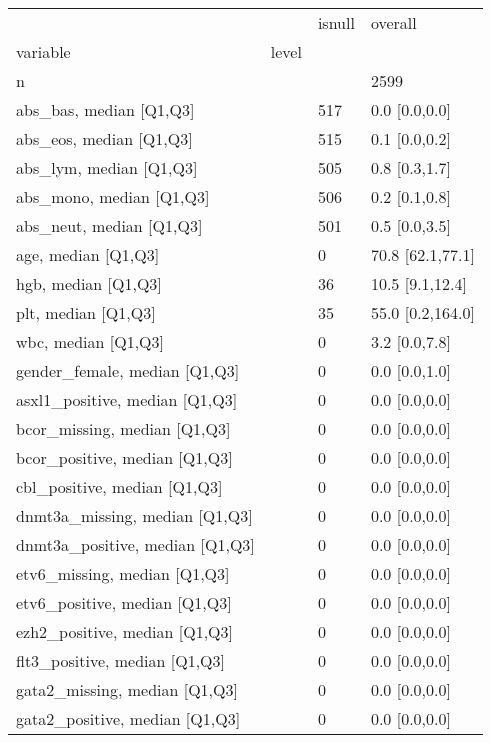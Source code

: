 \begin{tabular}{llll}
\toprule
                 &    & isnull &           overall \\
variable & level &        &                   \\
\midrule
n &    &        &              2599 \\
abs\_bas, median [Q1,Q3] &    &    517 &     0.0 [0.0,0.0] \\
abs\_eos, median [Q1,Q3] &    &    515 &     0.1 [0.0,0.2] \\
abs\_lym, median [Q1,Q3] &    &    505 &     0.8 [0.3,1.7] \\
abs\_mono, median [Q1,Q3] &    &    506 &     0.2 [0.1,0.8] \\
abs\_neut, median [Q1,Q3] &    &    501 &     0.5 [0.0,3.5] \\
age, median [Q1,Q3] &    &      0 &  70.8 [62.1,77.1] \\
hgb, median [Q1,Q3] &    &     36 &   10.5 [9.1,12.4] \\
plt, median [Q1,Q3] &    &     35 &  55.0 [0.2,164.0] \\
wbc, median [Q1,Q3] &    &      0 &     3.2 [0.0,7.8] \\
gender\_female, median [Q1,Q3] &    &      0 &     0.0 [0.0,1.0] \\
asxl1\_positive, median [Q1,Q3] &    &      0 &     0.0 [0.0,0.0] \\
bcor\_missing, median [Q1,Q3] &    &      0 &     0.0 [0.0,0.0] \\
bcor\_positive, median [Q1,Q3] &    &      0 &     0.0 [0.0,0.0] \\
cbl\_positive, median [Q1,Q3] &    &      0 &     0.0 [0.0,0.0] \\
dnmt3a\_missing, median [Q1,Q3] &    &      0 &     0.0 [0.0,0.0] \\
dnmt3a\_positive, median [Q1,Q3] &    &      0 &     0.0 [0.0,0.0] \\
etv6\_missing, median [Q1,Q3] &    &      0 &     0.0 [0.0,0.0] \\
etv6\_positive, median [Q1,Q3] &    &      0 &     0.0 [0.0,0.0] \\
ezh2\_positive, median [Q1,Q3] &    &      0 &     0.0 [0.0,0.0] \\
flt3\_positive, median [Q1,Q3] &    &      0 &     0.0 [0.0,0.0] \\
gata2\_missing, median [Q1,Q3] &    &      0 &     0.0 [0.0,0.0] \\
gata2\_positive, median [Q1,Q3] &    &      0 &     0.0 [0.0,0.0] \\

\end{tabular}

